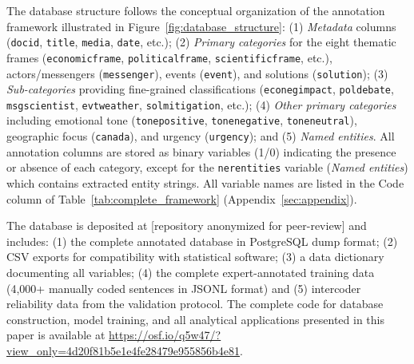 \documentclass[12pt]{article}
\renewcommand\_{\texttt{\detokenize{_}\allowbreak}}
\begin{document}
The database structure follows the conceptual organization of the annotation framework illustrated in Figure~\ref{fig:database_structure}: (1) \emph{Metadata} columns (\texttt{doc\_id}, \texttt{title}, \texttt{media}, \texttt{date}, etc.); (2) \emph{Primary categories} for the eight thematic frames (\texttt{economic\_frame}, \texttt{political\_frame}, \texttt{scientific\_frame}, etc.), actors/messengers (\texttt{messenger}), events (\texttt{event}), and solutions (\texttt{solution}); (3) \emph{Sub-categories} providing fine-grained classifications (\texttt{eco\_neg\_impact}, \texttt{pol\_debate}, \texttt{msg\_scientist}, \texttt{evt\_weather}, \texttt{sol\_mitigation}, etc.); (4) \emph{Other primary categories} including emotional tone (\texttt{tone\_positive}, \texttt{tone\_negative}, \texttt{tone\_neutral}), geographic focus (\texttt{canada}), and urgency (\texttt{urgency}); and (5) \emph{Named entities}. All annotation columns are stored as binary variables (1/0) indicating the presence or absence of each category, except for the \texttt{ner\_entities} variable (\emph{Named entities}) which contains extracted entity strings. All variable names are listed in the Code column of Table~\ref{tab:complete_framework} (Appendix~\ref{sec:appendix}).

The database is deposited at [repository anonymized for peer-review] and includes: (1) the complete annotated database in PostgreSQL dump format; (2) CSV exports for compatibility with statistical software; (3) a data dictionary documenting all variables; (4) the complete expert-annotated training data (4,000+ manually coded sentences in JSONL format) and (5) intercoder reliability data from the validation protocol. The complete code for database construction, model training, and all analytical applications presented in this paper is available at \url{https://osf.io/q5w47/?view_only=4d20f81b5e1e4fe28479e955856b4e81}.
\end{document}

